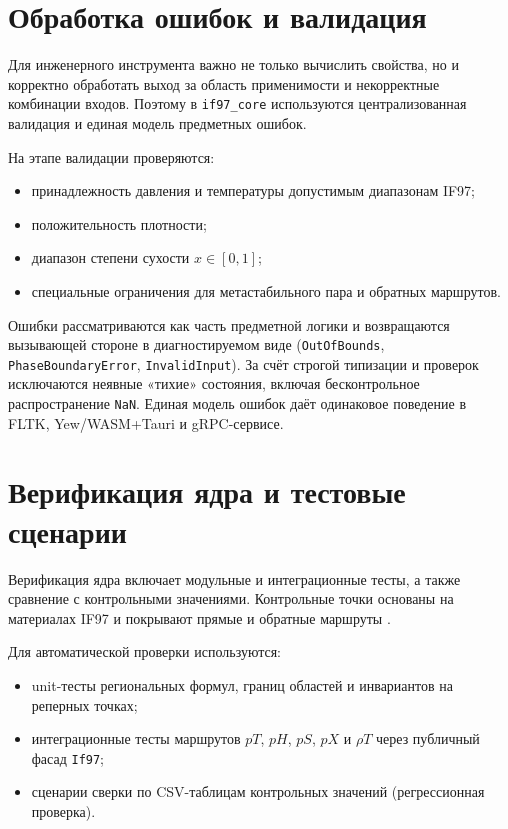 \section{Обработка ошибок и валидация}

Для инженерного инструмента важно
не только вычислить свойства,
но и корректно обработать выход за область применимости
и некорректные комбинации входов.
Поэтому в \texttt{if97\_core}
используются централизованная валидация
и единая модель предметных ошибок.

На этапе валидации проверяются:
\begin{itemize}
\item принадлежность давления и температуры допустимым диапазонам IF97;  
\item положительность плотности;  
\item диапазон степени сухости $x \in [0,1]$;  
\item специальные ограничения для метастабильного пара и обратных маршрутов.  
\end{itemize}

Ошибки рассматриваются как часть предметной логики
и возвращаются вызывающей стороне в диагностируемом виде
(\texttt{OutOfBounds}, \texttt{PhaseBoundaryError}, \texttt{InvalidInput}).
За счёт строгой типизации и проверок
исключаются неявные «тихие» состояния,
включая бесконтрольное распространение \texttt{NaN}.
Единая модель ошибок даёт одинаковое поведение
в FLTK, Yew/WASM+Tauri и gRPC-сервисе.

\section{Верификация ядра и тестовые сценарии}

Верификация ядра включает модульные и интеграционные тесты,
а также сравнение с контрольными значениями.
Контрольные точки основаны на материалах IF97
и покрывают прямые и обратные маршруты \cite{iapws_if97_2012}.

Для автоматической проверки используются:
\begin{itemize}
\item unit-тесты региональных формул, границ областей и инвариантов на реперных точках;  
\item интеграционные тесты маршрутов $pT$, $pH$, $pS$, $pX$ и $\rho T$ через публичный фасад \texttt{If97};  
\item сценарии сверки по CSV-таблицам контрольных значений (регрессионная проверка).  
\end{itemize}

